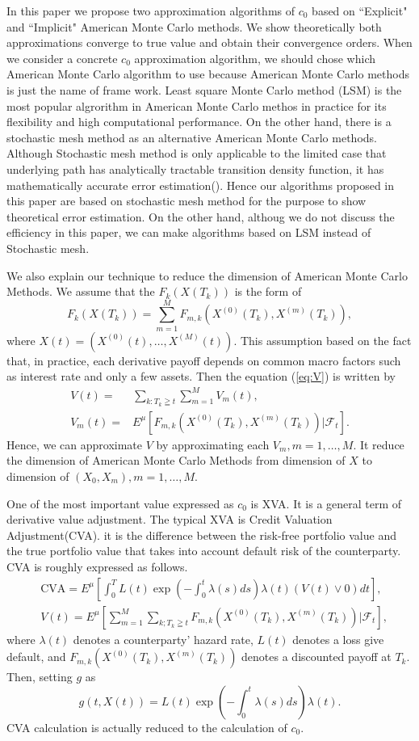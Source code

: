 \documentclass[12pt]{article}
\begin{document}
In this paper we propose two approximation algorithms of $c_0$ based on
``Explicit" and ``Implicit" American Monte Carlo methods.
We show theoretically both approximations converge to true value
and obtain their convergence orders.
When we consider a concrete $c_0$ approximation algorithm, 
we should chose which American Monte Carlo algorithm to use because 
American Monte Carlo methods is just the name of frame work.
Least square Monte Carlo method (LSM) is the most popular algrorithm in American 
Monte Carlo methos in practice for its flexibility
and high computational performance. 
On the other hand, there is a stochastic mesh method as an alternative American Monte
Carlo methods. Although Stochastic mesh method is only applicable to the limited case that 
underlying path has analytically tractable transition density function,
it has mathematically accurate error estimation(\cite{KM}).
Hence our algorithms proposed in this paper are based on stochastic mesh method for 
the purpose to show theoretical error estimation.
On the other hand, althoug we do not discuss the efficiency in this paper,
we can make algorithms based on LSM instead of Stochastic mesh.

We also explain our technique to reduce the dimension of American Monte Carlo Methods.
We assume that the $F_k(X(T_k))$ is the form of 
$$F_k(X(T_k)) = \sum_{m=1}^M {F}_{m,k}(X^{(0)}(T_k), X^{(m)}(T_k)),$$
where
$X(t)=(X^{(0)}(t),\ldots, X^{(M)}(t)).$ 
This assumption based on the fact that, in practice, each derivative payoff
depends on common macro factors such as interest rate and only a few assets. 
Then the equation (\ref{eq:V}) is written by
\begin{align}\label{eq:V2}
    V(t) =  &\sum_{k:T_k\geqq t} \sum_{m=1}^M  V_m(t), \\
    V_m(t)= &E^{\mu}\left[ {F}_{m,k}\left(X^{(0)}(T_k), X^{(m)}(T_k) \right) |\mathcal{F}_t \right].
\end{align}
Hence, we can approximate $V$ by approximating each $V_m, m = 1, \dots, M.$ 
It reduce the dimension of American Monte Carlo Methods from dimension of $X$
to dimension of $(X_0, X_m), m = 1,\dots, M.$ 

One of the most important value expressed as $c_0$ is XVA.
It is a general term of derivative value adjustment.
The typical XVA is Credit Valuation Adjustment(CVA).
it is the difference
between the risk-free portfolio value and the true portfolio value that takes into account
default risk of the counterparty. CVA is roughly expressed as follows.
\begin{align}
    & \text{CVA}=E^{\mu}\left[\int_0^T L(t)\exp(-\int_0^t \lambda(s)ds ) \lambda(t) (V(t) \vee 0)  dt \right],\\
    &V(t) =E^{\mu} \left[\sum_{m=1}^M \sum_{k; T_k \geqq t}F_{m,k}(X^{(0)}(T_k), X^{(m)}(T_k)) | \mathcal{F}_t\right],
\end{align}
where $\lambda(t)$ denotes a counterparty' hazard rate, $L(t)$ denotes a
loss give default, and $F_{m,k}(X^{(0)}(T_k), X^{(m)}(T_k))$ denotes a discounted 
payoff at $T_k$.
Then, setting $g$ as 
$$ g(t,X(t)) = L(t)\exp(-\int_0^t \lambda(s)ds ) \lambda(t).$$
CVA calculation is actually reduced to the calculation of $c_0.$
\end{document}

